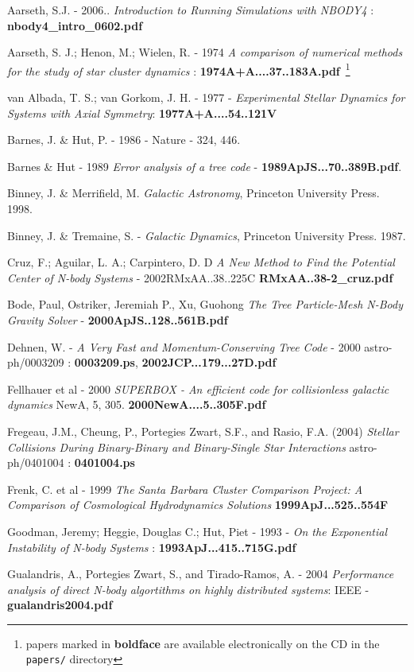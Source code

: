 {Aarseth, S.J. - 2006.. {\it Introduction to Running Simulations with NBODY4} : 
{\bf nbody4\_intro\_0602.pdf}


Aarseth, S. J.; Henon, M.; Wielen, R. - 1974
{\it A comparison of numerical methods for the study of star cluster 
dynamics} : {\bf 1974A+A....37..183A.pdf}~\footnote{papers marked 
in {\bf boldface} are available electronically on the CD in the {\tt papers/} directory}

van Albada, T. S.; van Gorkom, J. H.	- 1977 -
{\it Experimental Stellar Dynamics for Systems with Axial Symmetry}:
{\bf 1977A+A....54..121V}



Barnes, J. \& Hut, P. - 1986 - Nature - 324, 446.

Barnes \& Hut - 1989
{\it Error analysis of a tree code} - {\bf 1989ApJS...70..389B.pdf}.

Binney, J. \& Merrifield, M. {\it Galactic Astronomy}, Princeton University Press. 1998.

Binney, J. \& Tremaine, S. - {\it Galactic Dynamics}, Princeton University Press. 1987. 

Cruz, F.; Aguilar, L. A.; Carpintero, D. D
{\it A New Method to Find the Potential Center of N-body Systems} - 2002RMxAA..38..225C
{\bf RMxAA..38-2\_cruz.pdf}

Bode, Paul, Ostriker, Jeremiah P., Xu, Guohong
{\it The Tree Particle-Mesh N-Body Gravity Solver} - 
{\bf  2000ApJS..128..561B.pdf}

Dehnen, W. - {\it A Very Fast and Momentum-Conserving Tree Code} - 2000
astro-ph/0003209 : {\bf 0003209.ps}, {\bf 2002JCP...179...27D.pdf}

Fellhauer et al - 2000 
{\it SUPERBOX - An efficient code for collisionless galactic dynamics}
NewA, 5, 305. {\bf 2000NewA....5..305F.pdf} 

Fregeau, J.M., Cheung, P., Portegies Zwart, S.F., and Rasio, F.A. (2004)
{\it Stellar Collisions During Binary-Binary and Binary-Single Star Interactions}
astro-ph/0401004 : {\bf 0401004.ps}

Frenk, C. et al - 1999 
{\it The Santa Barbara Cluster Comparison Project: A Comparison of Cosmological Hydrodynamics Solutions}
{\bf 1999ApJ...525..554F}

Goodman, Jeremy; Heggie, Douglas C.; Hut, Piet - 1993 -
{\it On the Exponential Instability of N-body Systems} :
{\bf 1993ApJ...415..715G.pdf}

Gualandris, A., Portegies Zwart, S., and Tirado-Ramos, A. - 2004
{\it Performance analysis of direct N-body algortithms on highly distributed systems}:
IEEE - {\bf gualandris2004.pdf}

}
